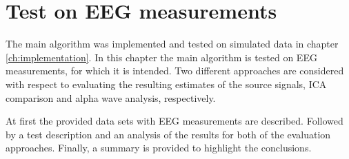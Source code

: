 \chapter{Test on EEG measurements}\label{ch:eeg_test}
The main algorithm was implemented and tested on simulated data in chapter \ref{ch:implementation}. 
In this chapter the main algorithm is tested on EEG measurements, for which it is intended. 
Two different approaches are considered with respect to evaluating the resulting estimates of the source signals, ICA comparison and alpha wave analysis, respectively.

At first the provided data sets with EEG measurements are described. 
Followed by a test description and an analysis of the results for both of the evaluation approaches. 
Finally, a summary is provided to highlight the conclusions.  

